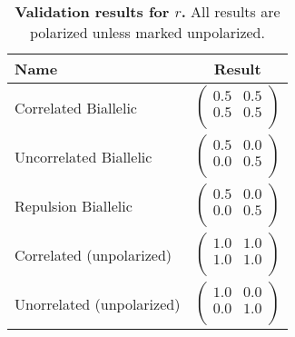 \documentclass[12pt]{article}
\begin{document}
\begin{table}[H]
  \begin{tabular}{lc} Name & Result \\
    \hline
    Correlated Biallelic & $\left(\begin{array}{cc}
                                    0.5 & 0.5 \\
                                    0.5 & 0.5 \\
                                  \end{array}\right)$ \\
    Uncorrelated Biallelic & $\left(\begin{array}{cc}
                                      0.5 & 0.0 \\
                                      0.0 & 0.5 \\
                                    \end{array}\right)$ \\
    Repulsion Biallelic & $\left(\begin{array}{cc}
                                    0.5 & 0.0 \\
                                    0.0 & 0.5 \\
                                 \end{array}\right)$ \\
    Correlated (unpolarized) & $\left(\begin{array}{cc}
                                        1.0 & 1.0 \\
                                        1.0 & 1.0 \\
                                      \end{array}\right)$ \\
    Unorrelated (unpolarized) & $\left(\begin{array}{cc}
                                         1.0 & 0.0 \\
                                         0.0 & 1.0 \\
                                       \end{array}\right)$ \\
  \end{tabular}
  \caption{
    \textbf{Validation results for $r$.}
    All results are polarized unless marked unpolarized.
  }
\end{table}



\end{document}
